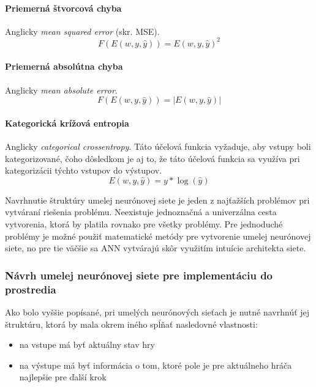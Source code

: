 \paragraph{Priemerná štvorcová chyba}\cite{algo_ann_mse}
Anglicky \emph{mean squared error} (skr. MSE).
\begin{equation}
    F(E(w, y, \hat{y}))=E(w, y, \hat{y})^2
\end{equation}
\paragraph{Priemerná absolútna chyba}\cite{algo_ann_mae}
Anglicky \emph{mean absolute error}.
\begin{equation}
    F(E(w, y, \hat{y}))=|E(w, y, \hat{y})|
\end{equation}
\paragraph{Kategorická krížová entropia}\cite{algo_ann_categorical_crossentropy}
Anglicky \emph{categorical crossentropy}.
Táto účelová funkcia vyžaduje, aby vstupy boli kategorizované, čoho dôsledkom je aj to, že táto účelová funkcia sa
využíva pri kategorizácii týchto vstupov do výstupov.
\begin{equation}
    E(w, y, \hat{y})=y*\log(\hat{y})
\end{equation}

Navrhnutie štruktúry umelej neurónovej siete je jeden z najťažších problémov pri vytváraní riešenia problému.
Neexistuje jednoznačná a univerzálna cesta vytvorenia, ktorá by platila rovnako pre všetky problémy.
Pre jednoduché problémy je možné použiť matematické metódy pre vytvorenie umelej neurónovej siete, no pre tie väčšie
sa ANN vytvárajú skôr využitím intuície architekta siete.

\subsubsection{Návrh umelej neurónovej siete pre implementáciu do prostredia}

Ako bolo vyššie popísané, pri umelých neurónových sieťach je nutné navrhnúť jej štruktúru, ktorá by mala okrem iného
spĺňať nasledovné vlastnosti:
\begin{itemize}
    \item na vstupe má byť aktuálny stav hry
    \item na výstupe má byť informácia o tom, ktoré pole je pre aktuálneho hráča najlepšie pre ďalší krok
\end{itemize}

